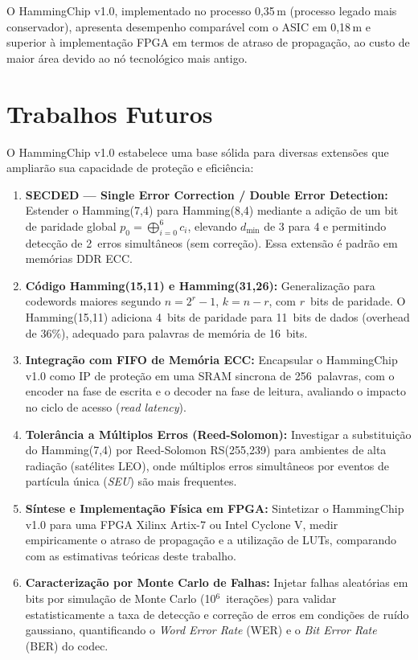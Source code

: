 \documentclass[12pt,a4paper]{article}
\begin{document}
O HammingChip v1.0, implementado no processo 0,35\,\textmu m (processo legado mais conservador), apresenta desempenho comparável com o ASIC em 0,18\,\textmu m e superior à implementação FPGA em termos de atraso de propagação, ao custo de maior área devido ao nó tecnológico mais antigo.

\section{Trabalhos Futuros}

O HammingChip v1.0 estabelece uma base sólida para diversas extensões que ampliarão sua capacidade de proteção e eficiência:

\begin{enumerate}[leftmargin=2em,label=\textbf{TF\arabic*.}]
  \item \textbf{SECDED --- Single Error Correction / Double Error Detection:}
    Estender o Hamming(7,4) para Hamming(8,4) mediante a adição de um bit de paridade global $p_0 = \bigoplus_{i=0}^{6} c_i$, elevando $d_{\min}$ de 3 para 4 e permitindo detecção de 2~erros simultâneos (sem correção). Essa extensão é padrão em memórias DDR ECC.

  \item \textbf{Código Hamming(15,11) e Hamming(31,26):}
    Generalização para codewords maiores segundo $n = 2^r - 1$, $k = n - r$, com $r$~bits de paridade. O Hamming(15,11) adiciona 4~bits de paridade para 11~bits de dados (overhead de 36\%), adequado para palavras de memória de 16~bits.

  \item \textbf{Integração com FIFO de Memória ECC:}
    Encapsular o HammingChip v1.0 como IP de proteção em uma SRAM sincrona de 256~palavras, com o encoder na fase de escrita e o decoder na fase de leitura, avaliando o impacto no ciclo de acesso (\textit{read latency}).

  \item \textbf{Tolerância a Múltiplos Erros (Reed-Solomon):}
    Investigar a substituição do Hamming(7,4) por Reed-Solomon RS(255,239) para ambientes de alta radiação (satélites LEO), onde múltiplos erros simultâneos por eventos de partícula única (\textit{SEU}) são mais frequentes.

  \item \textbf{Síntese e Implementação Física em FPGA:}
    Sintetizar o HammingChip v1.0 para uma FPGA Xilinx Artix-7 ou Intel Cyclone V, medir empiricamente o atraso de propagação e a utilização de LUTs, comparando com as estimativas teóricas deste trabalho.

  \item \textbf{Caracterização por Monte Carlo de Falhas:}
    Injetar falhas aleatórias em bits por simulação de Monte Carlo (10$^6$~iterações) para validar estatisticamente a taxa de detecção e correção de erros em condições de ruído gaussiano, quantificando o \textit{Word Error Rate} (WER) e o \textit{Bit Error Rate} (BER) do codec.
\end{enumerate}
\end{document}
